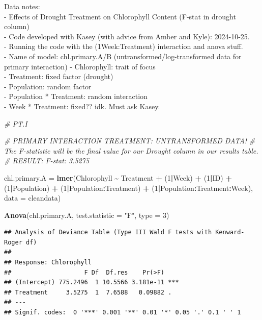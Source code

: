 \documentclass[
]{article}
\newenvironment{Shaded}{\begin{snugshade}}{\end{snugshade}}
\newcommand{\AttributeTok}[1]{\textcolor[rgb]{0.13,0.29,0.53}{#1}}
\newcommand{\CommentTok}[1]{\textcolor[rgb]{0.56,0.35,0.01}{\textit{#1}}}
\newcommand{\DecValTok}[1]{\textcolor[rgb]{0.00,0.00,0.81}{#1}}
\newcommand{\FunctionTok}[1]{\textcolor[rgb]{0.13,0.29,0.53}{\textbf{#1}}}
\newcommand{\NormalTok}[1]{#1}
\newcommand{\OtherTok}[1]{\textcolor[rgb]{0.56,0.35,0.01}{#1}}
\newcommand{\SpecialCharTok}[1]{\textcolor[rgb]{0.81,0.36,0.00}{\textbf{#1}}}
\newcommand{\StringTok}[1]{\textcolor[rgb]{0.31,0.60,0.02}{#1}}
\begin{document}
Data notes:\\
- Effects of Drought Treatment on Chlorophyll Content (F-stat in drought
column)\\
- Code developed with Kasey (with advice from Amber and Kyle):
2024-10-25.\\
- Running the code with the (1\textbar Week:Treatment) interaction and
anova stuff.\\
- Name of model: chl.primary.A/B (untransformed/log-transformed data for
primary interaction) - Chlorophyll: trait of focus\\
- Treatment: fixed factor (drought)\\
- Population: random factor\\
- Population * Treatment: random interaction\\
- Week * Treatment: fixed?? idk. Must ask Kasey.

\begin{Shaded}
\begin{Highlighting}[]
\CommentTok{\# PT.I  }

\CommentTok{\# PRIMARY INTERACTION TREATMENT: UNTRANSFORMED DATA!  }
\CommentTok{\# The F{-}statistic will be the final value for our Drought column in our results table.}
\CommentTok{\# RESULT: F{-}stat: 3.5275}

\NormalTok{chl.primary.A }\OtherTok{=} \FunctionTok{lmer}\NormalTok{(Chlorophyll }\SpecialCharTok{\textasciitilde{}}\NormalTok{ Treatment }\SpecialCharTok{+}\NormalTok{ (}\DecValTok{1}\SpecialCharTok{|}\NormalTok{Week) }\SpecialCharTok{+}\NormalTok{ (}\DecValTok{1}\SpecialCharTok{|}\NormalTok{ID) }\SpecialCharTok{+}\NormalTok{ (}\DecValTok{1}\SpecialCharTok{|}\NormalTok{Population) }\SpecialCharTok{+}\NormalTok{ (}\DecValTok{1}\SpecialCharTok{|}\NormalTok{Population}\SpecialCharTok{:}\NormalTok{Treatment) }\SpecialCharTok{+}\NormalTok{ (}\DecValTok{1}\SpecialCharTok{|}\NormalTok{Population}\SpecialCharTok{:}\NormalTok{Treatment}\SpecialCharTok{:}\NormalTok{Week), }\AttributeTok{data =}\NormalTok{ cleandata)}

\FunctionTok{Anova}\NormalTok{(chl.primary.A, }\AttributeTok{test.statistic =} \StringTok{"F"}\NormalTok{, }\AttributeTok{type =} \DecValTok{3}\NormalTok{)}
\end{Highlighting}
\end{Shaded}

\begin{verbatim}
## Analysis of Deviance Table (Type III Wald F tests with Kenward-Roger df)
## 
## Response: Chlorophyll
##                    F Df  Df.res    Pr(>F)    
## (Intercept) 775.2496  1 10.5566 3.181e-11 ***
## Treatment     3.5275  1  7.6588   0.09882 .  
## ---
## Signif. codes:  0 '***' 0.001 '**' 0.01 '*' 0.05 '.' 0.1 ' ' 1
\end{verbatim}
\end{document}
